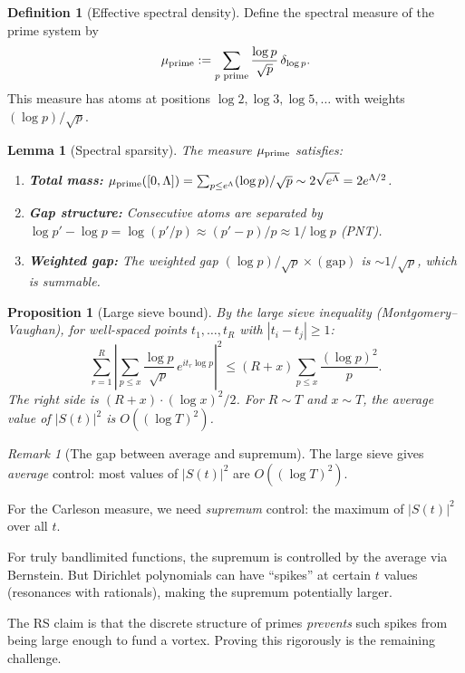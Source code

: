 \documentclass[11pt]{article}
\newtheorem{proposition}[theorem]{Proposition}
\newtheorem{lemma}[theorem]{Lemma}
\theoremstyle{definition}
\newtheorem{definition}[theorem]{Definition}
\theoremstyle{remark}
\newtheorem{remark}[theorem]{Remark}
\theoremstyle{definition}
\begin{document}
\begin{definition}[Effective spectral density]
Define the spectral measure of the prime system by
\[
  \mu_{\rm prime} := \sum_{p \text{ prime}} \frac{\log p}{\sqrt{p}}\,\delta_{\log p}.
\]
This measure has atoms at positions $\log 2, \log 3, \log 5, \ldots$ with weights $(\log p)/\sqrt{p}$.
\end{definition}

\begin{lemma}[Spectral sparsity]\label{lem:spectral-sparsity}
The measure $\mu_{\rm prime}$ satisfies:
\begin{enumerate}
\item \textbf{Total mass:} $\mu_{\rm prime}([0, \Lambda]) = \sum_{p \le e^\Lambda} (\log p)/\sqrt{p} \sim 2\sqrt{e^\Lambda} = 2e^{\Lambda/2}$.
\item \textbf{Gap structure:} Consecutive atoms are separated by $\log p' - \log p = \log(p'/p) \approx (p'-p)/p \approx 1/\log p$ (PNT).
\item \textbf{Weighted gap:} The weighted gap $(\log p)/\sqrt{p} \times (\text{gap})$ is $\sim 1/\sqrt{p}$, which is summable.
\end{enumerate}
\end{lemma}

\begin{proposition}[Large sieve bound]\label{prop:large-sieve-prime}
By the large sieve inequality (Montgomery--Vaughan), for well-spaced points $t_1, \ldots, t_R$ with $|t_i - t_j| \ge 1$:
\[
  \sum_{r=1}^R \left|\sum_{p \le x} \frac{\log p}{\sqrt{p}}\,e^{it_r \log p}\right|^2 
  \le (R + x) \sum_{p \le x} \frac{(\log p)^2}{p}.
\]
The right side is $(R + x) \cdot (\log x)^2 / 2$. For $R \sim T$ and $x \sim T$, the \emph{average} value of $|S(t)|^2$ is $O((\log T)^2)$.
\end{proposition}

\begin{remark}[The gap between average and supremum]
The large sieve gives \emph{average} control: most values of $|S(t)|^2$ are $O((\log T)^2)$.

For the Carleson measure, we need \emph{supremum} control: the maximum of $|S(t)|^2$ over all $t$.

For truly bandlimited functions, the supremum is controlled by the average via Bernstein. But Dirichlet polynomials can have ``spikes'' at certain $t$ values (resonances with rationals), making the supremum potentially larger.

The RS claim is that the discrete structure of primes \emph{prevents} such spikes from being large enough to fund a vortex. Proving this rigorously is the remaining challenge.
\end{remark}
\end{document}
